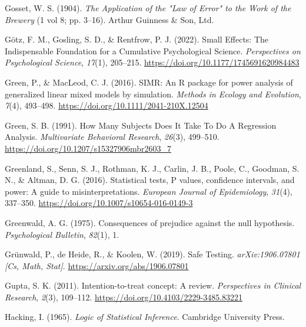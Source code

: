 \documentclass[
  oneside]{krantz}
\newlength{\cslhangindent}
\newlength{\cslentryspacingunit} %
\newenvironment{CSLReferences}[2] %
 {%
  \setlength{\parindent}{0pt}
  \ifodd #1
  \let\oldpar\par
  \def\par{\hangindent=\cslhangindent\oldpar}
  \fi
  \setlength{\parskip}{#2\cslentryspacingunit}
 }%
 {}
\begin{document}
\begin{CSLReferences}{1}{0}
\leavevmode{}%
Gosset, W. S. (1904). \emph{The {Application} of the "{Law} of {Error}"
to the {Work} of the {Brewery}} (1 vol 8; pp. 3--16). {Arthur Guinness
\& Son, Ltd.}

\leavevmode{}%
Götz, F. M., Gosling, S. D., \& Rentfrow, P. J. (2022). Small {Effects}:
{The Indispensable Foundation} for a {Cumulative Psychological Science}.
\emph{Perspectives on Psychological Science}, \emph{17}(1), 205--215.
\url{https://doi.org/10.1177/1745691620984483}

\leavevmode{}%
Green, P., \& MacLeod, C. J. (2016). {SIMR}: An {R} package for power
analysis of generalized linear mixed models by simulation. \emph{Methods
in Ecology and Evolution}, \emph{7}(4), 493--498.
\url{https://doi.org/10.1111/2041-210X.12504}

\leavevmode{}%
Green, S. B. (1991). How {Many Subjects Does It Take To Do A Regression
Analysis}. \emph{Multivariate Behavioral Research}, \emph{26}(3),
499--510. \url{https://doi.org/10.1207/s15327906mbr2603_7}

\leavevmode{}%
Greenland, S., Senn, S. J., Rothman, K. J., Carlin, J. B., Poole, C.,
Goodman, S. N., \& Altman, D. G. (2016). Statistical tests, {P} values,
confidence intervals, and power: A guide to misinterpretations.
\emph{European Journal of Epidemiology}, \emph{31}(4), 337--350.
\url{https://doi.org/10.1007/s10654-016-0149-3}

\leavevmode{}%
Greenwald, A. G. (1975). Consequences of prejudice against the null
hypothesis. \emph{Psychological Bulletin}, \emph{82}(1), 1.

\leavevmode{}%
Grünwald, P., de Heide, R., \& Koolen, W. (2019). Safe {Testing}.
\emph{arXiv:1906.07801 {[}Cs, Math, Stat{]}}.
\url{https://arxiv.org/abs/1906.07801}

\leavevmode{}%
Gupta, S. K. (2011). Intention-to-treat concept: {A} review.
\emph{Perspectives in Clinical Research}, \emph{2}(3), 109--112.
\url{https://doi.org/10.4103/2229-3485.83221}

\leavevmode{}%
Hacking, I. (1965). \emph{Logic of {Statistical Inference}}. {Cambridge
University Press}.


\end{CSLReferences}
\end{document}
